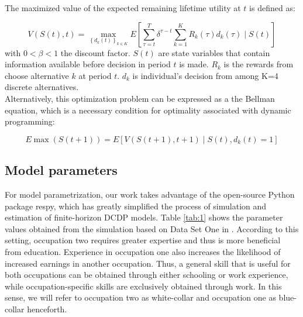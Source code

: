 \noindent
The maximized value of the expected remaining lifetime utility at $t$ is defined as:

\begin{equation}\label{eq:4}
V(S(t), t)=\max _{\left\{d_{k}(t)\right\}_{k \in K}} E\left[\sum_{\tau=t}^{T} \delta^{\tau-t} \sum_{k=1}^{K} R_{k}(\tau) d_{k}(\tau) \mid S(t)\right]
\end{equation}
with $0< \beta < 1$ the discount factor. $S(t)$ are state variables that contain information available before decision in period $t$ is made. $R_k$ is the rewards from choose alternative $k$ at period $t$. $d_k$ is individual's decision from among K=4 discrete alternatives. \\

\noindent
Alternatively, this optimization problem can be expressed as a the Bellman equation, which is a necessary condition for optimality associated with dynamic programming\citep{bellman1966DynamicProgramming, eisenhauer2019ApproximateSolutionFinite}:

\begin{equation}
E \max (S(t+1))=E\left[V(S(t+1), t+1) \mid S(t), d_{k}(t)=1\right]
\end{equation}



\subsection{Model parameters} \label{sec:2.2}



For model parametrization, our work takes advantage of the open-source Python package respy\citep{janosgabler2020RespyFrameworkSimulation}, which has greatly simplified the process of simulation and estimation of finite-horizon DCDP models. Table \ref{tab:1} shows the parameter values obtained from the simulation based on Data Set One in \cite{keane1994SolutionEstimationDiscrete}. According to this setting, occupation two requires greater expertise and thus is more beneficial from education. Experience in occupation one also increases the likelihood of increased earnings in another occupation. Thus, a general skill that is useful for both occupations can be obtained through either schooling or work experience, while occupation-specific skills are exclusively obtained through work. In this sense, we will refer to occupation two as white-collar and occupation one as blue-collar henceforth. \\

